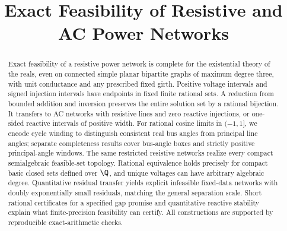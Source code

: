 \documentclass[11pt]{article}
\title{Exact Feasibility of Resistive and AC Power Networks}
\author{}
\date{}
\begin{document}
\maketitle
\begin{abstract}
Exact feasibility of a resistive power network is complete for the existential
theory of the reals, even on connected simple planar bipartite graphs of
maximum degree three, with unit conductance and any prescribed fixed girth.
Positive voltage intervals and signed injection intervals have endpoints in
fixed finite rational sets. A reduction from bounded addition and inversion
preserves the entire solution set by a rational bijection. It transfers to
AC networks with resistive lines and zero reactive injections, or one-sided
reactive intervals of positive width. For rational cosine limits in $(-1,1]$, we encode cycle winding to distinguish consistent real
bus angles from principal line angles; separate completeness results cover
bus-angle boxes and strictly positive principal-angle windows.
The same restricted resistive networks realize every compact semialgebraic
feasible-set topology. Rational equivalence holds precisely for compact basic
closed sets defined over $\Q$, and unique voltages can have arbitrary algebraic
degree. Quantitative residual transfer yields explicit infeasible fixed-data
networks with doubly exponentially small residuals, matching the general
separation scale. Short rational certificates for a specified gap promise and
quantitative reactive stability explain what finite-precision feasibility can
certify. All constructions are supported by reproducible exact-arithmetic
checks.
\end{abstract}








\appendix


\begingroup
\small


\endgroup
\end{document}
